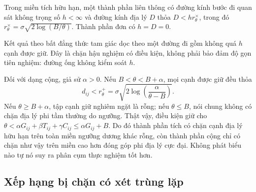 \documentclass[runningheads]{llncs}
\begin{document}
\begin{corollary}
Trong miền tích hữu hạn, một thành phần liên thông có đường kính bước đi
quan sát không trọng số $h<\infty$ và đường kính địa lý $D$ thỏa
$D<hr_\theta^\times$, trong đó
$r_\theta^\times=\sigma\sqrt{2\log(B/\theta)}$. Thành phần đơn có $h=D=0$.
\end{corollary}
Kết quả theo bất đẳng thức tam giác dọc theo một đường đi gồm không quá $h$
cạnh được giữ. Đây là chặn hậu nghiệm có điều kiện, không phải bảo đảm độ
gọn tiên nghiệm: đường ống không kiểm soát $h$.

Đối với dạng cộng, giả sử $\alpha>0$. Nếu $B<\theta<B+\alpha$, mọi cạnh
được giữ đều thỏa
\[
d_{ij}<r_\theta^+
=\sigma\sqrt{2\log\!\left(\frac{\alpha}{\theta-B}\right)}.
\]
Nếu $\theta\ge B+\alpha$, tập cạnh giữ nghiêm ngặt là rỗng; nếu
$\theta\le B$, nói chung không có chặn địa lý phi tầm thường do ngưỡng.
Thật vậy, điều kiện giữ cho
$\theta<\alpha G_{ij}+\beta T_{ij}+\gamma C_{ij}\le\alpha G_{ij}+B$.
Do đó thành phần tích có chặn cạnh địa lý hữu hạn trên toàn miền ngưỡng
dương khác rỗng, còn thành phần cộng chỉ có chặn như vậy trên miền cao hơn
đóng góp phi địa lý cực đại. Không phát biểu nào tự nó suy ra phân cụm thực
nghiệm tốt hơn.

\subsection{Xếp hạng bị chặn có xét trùng lặp}
\end{document}
